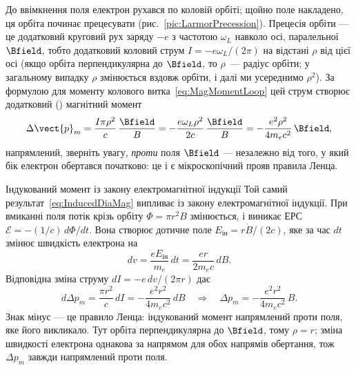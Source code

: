 До ввімкнення поля електрон рухався по коловій орбіті; щойно поле накладено,
ця орбіта починає прецесувати (рис.~\ref{pic:LarmorPrecession}).  Прецесія орбіти --- це додатковий круговий рух заряду $-e$ з частотою $\omega_L$ навколо осі, паралельної $\Bfield$, тобто додатковий коловий
струм $I=-e\omega_L/(2\pi)$ на відстані $\rho$ від цієї осі (якщо орбіта перпендикулярна до $\Bfield$, то $\rho$~--- радіус орбіти; у загальному випадку $\rho$ змінюється вздовж орбіти, і далі ми усереднимо $\rho^2$). За формулою для моменту колового витка~\eqref{eq:MagMomentLoop} цей струм створює
додатковий () магнітний момент
\begin{equation}\label{eq:InducedDiaMag}
	\Delta\vect{p}_m = \frac{I\pi\rho^2}{c}\,\frac{\Bfield}{B} = -\frac{e\omega_L\rho^2}{2c}\,\frac{\Bfield}{B} = -\frac{e^2\rho^2}{4m_ec^2}\, \Bfield,
\end{equation}
напрямлений, зверніть увагу, \emph{проти} поля $\Bfield$ --- незалежно від того, у який бік електрон обертався початково: це і є мікроскопічний
прояв правила Ленца.

\begin{Example}{Індукований момент із закону електромагнітної індукції\ExtraMark}\small
	Той самий результат~\eqref{eq:InducedDiaMag} випливає із закону
	електромагнітної індукції. При вмиканні поля потік крізь орбіту
	$\Phi=\pi r^2 B$ змінюється, і виникає ЕРС
	$\mathcal{E}=-(1/c)\,d\Phi/dt$. Вона створює дотичне поле
	$E_{\text{ін}}=r\dot B/(2c)$, яке за час $dt$ змінює швидкість електрона на
	\begin{equation*}
		dv = \frac{eE_{\text{ін}}}{m_e}\,dt
		= \frac{er}{2m_ec}\,dB .
	\end{equation*}
	Відповідна зміна струму $dI=-e\,dv/(2\pi r)$ дає
	\begin{equation*}
		d\Delta p_m = \frac{\pi r^2}{c}\,dI
		= -\frac{e^2 r^2}{4m_ec^2}\,dB
		\quad\Longrightarrow\quad
		\Delta p_m = -\frac{e^2 r^2}{4m_ec^2}\,B .
	\end{equation*}
	Знак мінус --- це правило Ленца: індукований момент напрямлений проти поля,
	яке його викликало. Тут орбіта перпендикулярна до $\Bfield$, тому $\rho=r$; зміна швидкості електрона однакова за напрямом для обох напрямів обертання, тож $\Delta p_m$ завжди напрямлений проти поля.
\end{Example}

